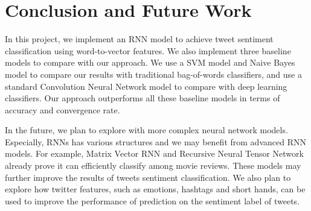 
\section{Conclusion and Future Work}  
%
In this project, we implement an RNN model to achieve tweet sentiment classification using word-to-vector features.
%
We also implement three baseline models to compare with our approach.
%
We use a SVM model and Naive Bayes model to compare our results with traditional bag-of-words classifiers, and use a standard Convolution Neural Network model to compare with deep learning classifiers.
%
Our approach outperforms all these baseline models in terms of accuracy and convergence rate.

In the future, we plan to explore with more complex neural network models.
%
Especially, RNNs has various structures and we may benefit from advanced RNN models. For example, Matrix Vector RNN \cite{socher2013recursive} and Recursive Neural Tensor Network \cite{socher2012semantic} already prove it can efficiently classify among movie reviews. 
%
These models may further improve the results of tweets sentiment classification.
%
We also plan to explore how twitter features, such as emotions, hashtags and short hands, can be used to improve the performance of prediction on the sentiment label of tweets.


 